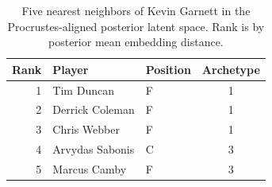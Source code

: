 \begin{table}[htbp]
  \centering\small
  \begin{tabular}{rllc}
    \toprule
    Rank & Player & Position & Archetype \\
    \midrule
    1 & Tim Duncan & F & 1 \\
    2 & Derrick Coleman & F & 1 \\
    3 & Chris Webber & F & 1 \\
    4 & Arvydas Sabonis & C & 3 \\
    5 & Marcus Camby & F & 3 \\
    \bottomrule
  \end{tabular}
  \caption{Five nearest neighbors of Kevin Garnett in the Procrustes-aligned posterior latent space. Rank is by posterior mean embedding distance.}
  \label{tab:Kevin_Garnett_neighbors}
\end{table}

